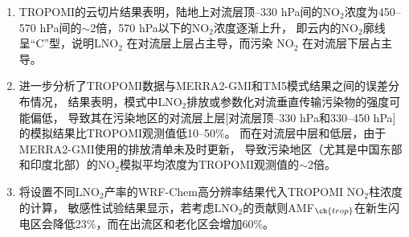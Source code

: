 \begin{enumerate}[label=（\arabic*）, labelindent=\parindent, leftmargin=0pt, widest=0, itemindent=*, topsep=0pt, partopsep=0pt, parsep=0pt]

\item TROPOMI的云切片结果表明，陆地上对流层顶--330 hPa间的NO$_2$浓度为450--570 hPa间的$\sim$2倍，570 hPa以下的NO$_2$浓度逐渐上升，
即云内的NO$_2$廓线呈“C”型，说明LNO$_2$ 在对流层上层占主导，而污染 NO$_2$ 在对流层下层占主导。

\item 进一步分析了TROPOMI数据与MERRA2-GMI和TM5模式结果之间的误差分布情况，
结果表明，模式中LNO$_2$排放或参数化对流垂直传输污染物的强度可能偏低，
导致其在污染地区的对流层上层[对流层顶--330 hPa和330--450 hPa]的模拟结果比TROPOMI观测值低10--50\%。
而在对流层中层和低层，由于MERRA2-GMI使用的排放清单未及时更新，
导致污染地区（尤其是中国东部和印度北部）的NO$_2$模拟平均浓度为TROPOMI观测值的$\sim$2倍。

\item 将设置不同LNO$_2$产率的WRF-Chem高分辨率结果代入TROPOMI NO$_2$柱浓度的计算，
敏感性试验结果显示，若考虑LNO$_2$的贡献则AMF$_{\ch{trop}}$在新生闪电区会降低23\%，而在出流区和老化区会增加60\%。

\end{enumerate}
